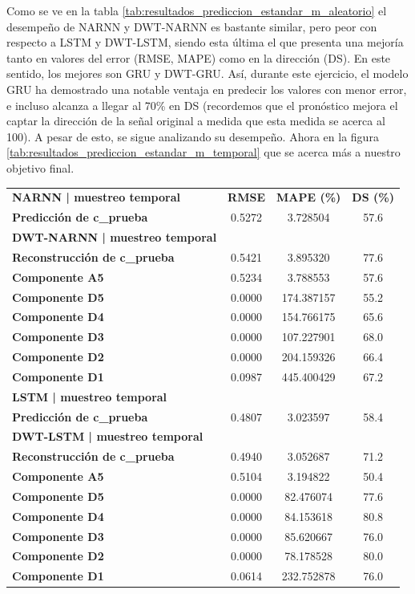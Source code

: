 Como se ve en la tabla \ref{tab:resultados_prediccion_estandar_m_aleatorio} el desempeño de NARNN y DWT-NARNN es bastante similar, pero peor con respecto a LSTM y DWT-LSTM, siendo esta última el que presenta una mejoría tanto en valores del error (RMSE, MAPE) como en la dirección (DS). En este sentido, los mejores son GRU y DWT-GRU. Así, durante este ejercicio, el modelo GRU ha demostrado una notable ventaja en predecir los valores con menor error, e incluso alcanza a llegar al 70\% en DS (recordemos que el pronóstico mejora el captar la dirección de la señal original a medida que esta medida se acerca al 100). A pesar de esto, se sigue analizando su desempeño. Ahora en la figura \ref{tab:resultados_prediccion_estandar_m_temporal} que se acerca más a nuestro objetivo final.

\begin{longtable}{lccc}

    \textbf{NARNN | muestreo temporal} & \textbf{RMSE} & \textbf{MAPE (\%)} & \textbf{DS (\%)} \\
\textbf{Predicción de c\_prueba} & 0.5272 & 3.728504 & 57.6 \\
\textbf{DWT-NARNN | muestreo temporal} &  &  &  \\
\textbf{Reconstrucción de c\_prueba} & 0.5421 & 3.895320 & 77.6 \\
\textbf{Componente A5} & 0.5234 & 3.788553 & 57.6 \\
\textbf{Componente D5} & 0.0000 & 174.387157 & 55.2 \\
\textbf{Componente D4} & 0.0000 & 154.766175 & 65.6 \\
\textbf{Componente D3} & 0.0000 & 107.227901 & 68.0 \\
\textbf{Componente D2} & 0.0000 & 204.159326 & 66.4 \\
\textbf{Componente D1} & 0.0987 & 445.400429 & 67.2 \\

\textbf{LSTM | muestreo temporal} &  &  &  \\
\textbf{Predicción de c\_prueba} & 0.4807 & 3.023597 & 58.4 \\
\textbf{DWT-LSTM | muestreo temporal} &  &  &  \\
\textbf{Reconstrucción de c\_prueba} & 0.4940 & 3.052687 & 71.2 \\
\textbf{Componente A5} & 0.5104 & 3.194822 & 50.4 \\
\textbf{Componente D5} & 0.0000 & 82.476074 & 77.6 \\
\textbf{Componente D4} & 0.0000 & 84.153618 & 80.8 \\
\textbf{Componente D3} & 0.0000 & 85.620667 & 76.0 \\
\textbf{Componente D2} & 0.0000 & 78.178528 & 80.0 \\
\textbf{Componente D1} & 0.0614 & 232.752878 & 76.0 \\


\end{longtable}
